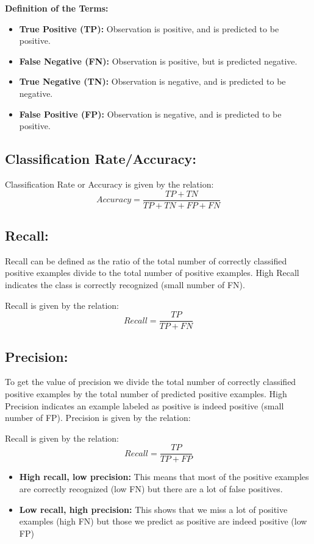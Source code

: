 \documentclass{report}
\begin{document}
\textbf{Definition of the Terms: }
\begin{itemize}
\item \textbf{True Positive (TP):} Observation is positive, and is predicted to be positive.
\item \textbf{False Negative (FN):} Observation is positive, but is predicted negative.
\item \textbf{True Negative (TN):} Observation is negative, and is predicted to be negative.
\item \textbf{False Positive (FP):} Observation is negative, and is predicted to be positive.
\end{itemize}

\subsection{Classification Rate/Accuracy:}
Classification Rate or Accuracy is given by the relation:
\[Accuracy = \frac{TP + TN}{TP + TN + FP + FN}\]

\subsection{Recall: }
Recall can be defined as the ratio of the total number of correctly classified positive examples divide to the total number of positive examples. High Recall indicates the class is correctly recognized (small number of FN).

Recall is given by the relation:
\[Recall = \frac{TP}{TP + FN}\]


\subsection{Precision: }
To get the value of precision we divide the total number of correctly classified positive examples by the total number of predicted positive examples. High Precision indicates an example labeled as positive is indeed positive (small number of FP).
Precision is given by the relation:

Recall is given by the relation:
\[Recall = \frac{TP}{TP + FP}\]

\begin{itemize}

\item \textbf{High recall, low precision:}
This means that most of the positive examples are correctly recognized (low FN) but there are a lot of false positives.

\item \textbf{Low recall, high precision:}
This shows that we miss a lot of positive examples (high FN) but those we predict as positive are indeed positive (low FP)
\end{itemize}
\end{document}
